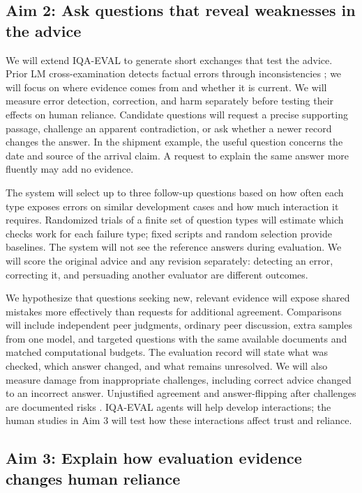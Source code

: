 \documentclass[12pt]{article}
\begin{document}
\subsection*{Aim 2: Ask questions that reveal weaknesses in the advice}

We will extend IQA-EVAL to generate short exchanges that test the advice. Prior LM cross-examination detects factual errors through inconsistencies \citep{cohen2023lmvslm}; we will focus on where evidence comes from and whether it is current. We will measure error detection, correction, and harm separately before testing their effects on human reliance. Candidate questions will request a precise supporting passage, challenge an apparent contradiction, or ask whether a newer record changes the answer. In the shipment example, the useful question concerns the date and source of the arrival claim. A request to explain the same answer more fluently may add no evidence.

The system will select up to three follow-up questions based on how often each type exposes errors on similar development cases and how much interaction it requires. Randomized trials of a finite set of question types will estimate which checks work for each failure type; fixed scripts and random selection provide baselines. The system will not see the reference answers during evaluation. We will score the original advice and any revision separately: detecting an error, correcting it, and persuading another evaluator are different outcomes.

We hypothesize that questions seeking new, relevant evidence will expose shared mistakes more effectively than requests for additional agreement. Comparisons will include independent peer judgments, ordinary peer discussion, extra samples from one model, and targeted questions with the same available documents and matched computational budgets. The evaluation record will state what was checked, which answer changed, and what remains unresolved. We will also measure damage from inappropriate challenges, including correct advice changed to an incorrect answer. Unjustified agreement and answer-flipping after challenges are documented risks \citep{sharma2023sycophancy,laban2023flipflop}. IQA-EVAL agents will help develop interactions; the human studies in Aim 3 will test how these interactions affect trust and reliance.

\subsection*{Aim 3: Explain how evaluation evidence changes human reliance}
\end{document}
